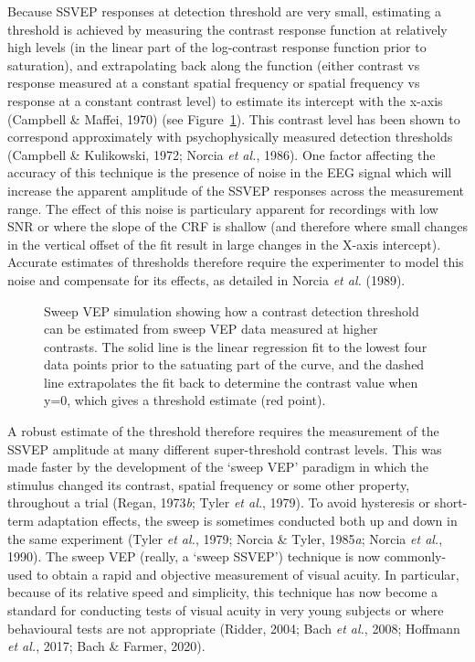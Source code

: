 \documentclass[
  letterpaper,
  DIV=11,
  numbers=noendperiod]{scrartcl}
\begin{document}
Because SSVEP responses at detection threshold are very small,
estimating a threshold is achieved by measuring the contrast response
function at relatively high levels (in the linear part of the
log-contrast response function prior to saturation), and extrapolating
back along the function (either contrast vs response measured at a
constant spatial frequency or spatial frequency vs response at a
constant contrast level) to estimate its intercept with the x-axis
(Campbell \& Maffei, 1970) (see Figure~\ref{fig-sweepvep}). This
contrast level has been shown to correspond approximately with
psychophysically measured detection thresholds (Campbell \& Kulikowski,
1972; Norcia \emph{et al.}, 1986). One factor affecting the accuracy of
this technique is the presence of noise in the EEG signal which will
increase the apparent amplitude of the SSVEP responses across the
measurement range. The effect of this noise is particulary apparent for
recordings with low SNR or where the slope of the CRF is shallow (and
therefore where small changes in the vertical offset of the fit result
in large changes in the X-axis intercept). Accurate estimates of
thresholds therefore require the experimenter to model this noise and
compensate for its effects, as detailed in Norcia \emph{et al.} (1989).

\begin{figure}


\caption{\label{fig-sweepvep}Sweep VEP simulation showing how a contrast
detection threshold can be estimated from sweep VEP data measured at
higher contrasts. The solid line is the linear regression fit to the
lowest four data points prior to the satuating part of the curve, and
the dashed line extrapolates the fit back to determine the contrast
value when y=0, which gives a threshold estimate (red point).}

\end{figure}%

A robust estimate of the threshold therefore requires the measurement of
the SSVEP amplitude at many different super-threshold contrast levels.
This was made faster by the development of the `sweep VEP' paradigm in
which the stimulus changed its contrast, spatial frequency or some other
property, throughout a trial (Regan, 1973\emph{b}; Tyler \emph{et al.},
1979). To avoid hysteresis or short-term adaptation effects, the sweep
is sometimes conducted both up and down in the same experiment (Tyler
\emph{et al.}, 1979; Norcia \& Tyler, 1985\emph{a}; Norcia \emph{et
al.}, 1990). The sweep VEP (really, a `sweep SSVEP') technique is now
commonly-used to obtain a rapid and objective measurement of visual
acuity. In particular, because of its relative speed and simplicity,
this technique has now become a standard for conducting tests of visual
acuity in very young subjects or where behavioural tests are not
appropriate (Ridder, 2004; Bach \emph{et al.}, 2008; Hoffmann \emph{et
al.}, 2017; Bach \& Farmer, 2020).
\end{document}
